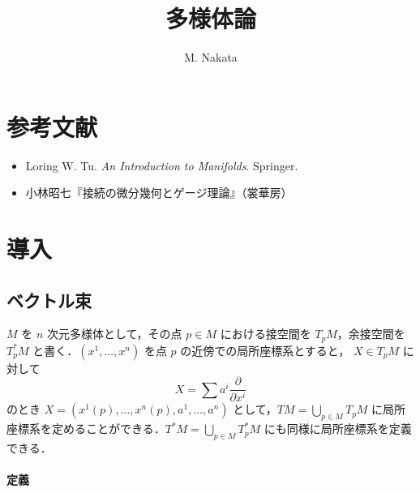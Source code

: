 \documentclass[pandoc,base=10pt,b5j,precisetext]{bxjsarticle}
\title{多様体論}
\author{M. Nakata}
\date{}
\providecommand{\tightlist}{%
  \setlength{\itemsep}{0pt}\setlength{\parskip}{0pt}}
\let\oldparagraph\paragraph
\renewcommand{\paragraph}[1]{\oldparagraph{#1}\mbox{}}
\begin{document}
\maketitle

{
\setcounter{tocdepth}{3}
\tableofcontents
}
\newcommand{\deli}{\,:\,}
\newcommand{\bb}[1]{\boldsymbol{#1}}
\renewcommand{\i}{\mathrm{i}}
\renewcommand{\bar}[1]{\overline{#1}}
\renewcommand{\le}{\leqslant}
\renewcommand{\ge}{\geqslant}
\newcommand{\qset}[2]{{#1}/\!\,{#2}}
\newcommand{\scr}[1]{\mathscr{#1}}
\renewcommand{\cal}[1]{\mathcal{#1}}
\newcommand{\pfrac}[2]{\frac{\partial #1}{\partial #2}}
\newcommand{\card}{\mathop{\mathrm{card}}\nolimits}
\newcommand{\Span}{\mathop{\mathrm{span}}}
\newcommand{\obj}{\mathop{\mathrm{obj}}}
\newcommand{\Hom}{\mathop{\mathrm{Hom}}}

\hypertarget{ux53c2ux8003ux6587ux732e}{%
\section{参考文献}\label{ux53c2ux8003ux6587ux732e}}

\begin{itemize}
\tightlist
\item
  Loring W. Tu. \emph{An Introduction to Manifolds}. Springer.
\item
  小林昭七『接続の微分幾何とゲージ理論』（裳華房）
\end{itemize}

\hypertarget{ux5c0eux5165}{%
\section{導入}\label{ux5c0eux5165}}

\hypertarget{ux30d9ux30afux30c8ux30ebux675f}{%
\subsection{ベクトル束}\label{ux30d9ux30afux30c8ux30ebux675f}}

\(M\) を \(n\) 次元多様体として，その点 \(p \in M\) における接空間を
\(T_pM\)，余接空間を \(T^*_p M\) と書く．\((x^1, \dotsc, x^n)\) を点
\(p\) の近傍での局所座標系とすると， \(X \in T_pM\) に対して \[
X = \sum a^i \pfrac{}{x^i}
\] のとき \(X = (x^1(p), \dotsc, x^n(p), a^1, \dotsc, a^n)\)
として，\(TM = \bigcup_{p \in M} T_pM\)
に局所座標系を定めることができる．\(T^*M = \bigcup_{p \in M} T^*_p M\)
にも同様に局所座標系を定義できる．

\hypertarget{ux5b9aux7fa9}{%
\paragraph{定義}\label{ux5b9aux7fa9}}
\end{document}
